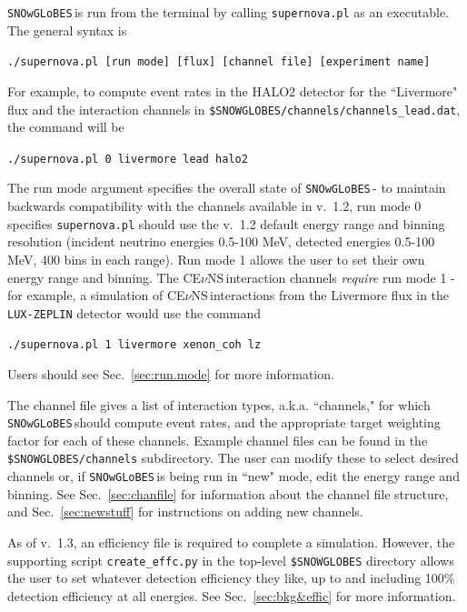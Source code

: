 \documentclass{article}
\newcommand{\cev}{CE$\nu$NS\,}
\newcommand{\snow}{\texttt{SNOwGLoBES}\,}
\begin{document}
\snow is run from the terminal by calling \texttt{supernova.pl} as an executable. The general syntax is

\begin{center}
    \texttt{./supernova.pl [run mode] [flux] [channel file] [experiment name]}
\end{center}

\noindent For example, to compute event rates in the HALO2 detector for the ``Livermore" flux and the interaction channels in \texttt{\$SNOWGLOBES/channels/channels\_lead.dat}, the command will be

\begin{center}
    \texttt{./supernova.pl 0 livermore lead halo2}
\end{center}

The run mode argument specifies the overall state of \snow - to maintain backwards compatibility with the channels available in v.~1.2, run mode 0 specifies \texttt{supernova.pl} should use the v.~1.2 default energy range and binning resolution (incident neutrino energies 0.5-100 MeV, detected energies 0.5-100 MeV, 400 bins in each range). Run mode 1 allows the user to set their own energy range and binning. The \cev interaction channels \textit{require} run mode 1 - for example, a simulation of \cev interactions from the Livermore flux in the \texttt{LUX-ZEPLIN} detector would use the command

\begin{center}
    \texttt{./supernova.pl 1 livermore xenon\_coh lz}
\end{center}

\noindent Users should see Sec.~\ref{sec:run.mode} for more information.

The channel file gives a list of interaction types, a.k.a. ``channels," for which \snow should compute event rates, and the appropriate target weighting factor for each of these channels. Example channel files can be found in the \texttt{\$SNOWGLOBES/channels} subdirectory. The user can modify these to select desired channels or, if \snow is being run in ``new" mode, edit the energy range and binning. See Sec.~\ref{sec:chanfile} for information about the channel file structure, and Sec.~\ref{sec:newstuff} for instructions on adding new channels.

As of v.~1.3, an efficiency file is required to complete a simulation. However, the supporting script \texttt{create\_effc.py} in the top-level \texttt{\$SNOWGLOBES} directory allows the user to set whatever detection efficiency they like, up to and including 100\% detection efficiency at all energies. See Sec.~\ref{sec:bkg&effic} for more information.
\end{document}

